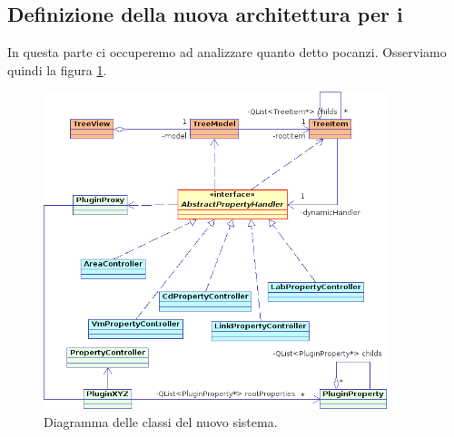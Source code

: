 \subsection{Definizione della nuova architettura per i \plugin{}}
In questa parte ci occuperemo ad analizzare quanto detto pocanzi. Osserviamo quindi la figura \ref{figura:properties_uml1}.

\begin{figure}[!htb]
	\centering
	\includegraphics[width=10cm]{images/properties_uml1.png}
	\caption{Diagramma delle classi del nuovo sistema.}
	\label{figura:properties_uml1}
\end{figure}

